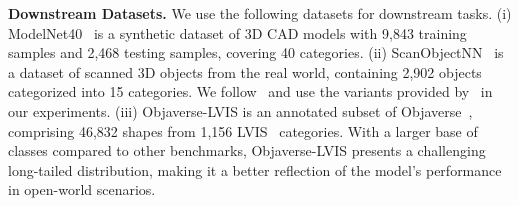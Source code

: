 \documentclass{article}
\begin{document}
\begin{table}[h]
\begin{minipage}{.53\linewidth}
\end{minipage}\hspace{.02\linewidth}
\begin{minipage}{.43\linewidth}
\centering
\caption{CLIP models used in experiments. } \label{tab:clip-models}
\vspace{0.3cm}
\end{minipage}
\vspace{-0.1cm}
\end{table}

\textbf{Downstream Datasets.} We use the following datasets for downstream tasks.
(i) ModelNet40~\cite{wu2015modelnet} is a synthetic dataset of 3D CAD models with 9,843 training samples and 2,468 testing samples, covering 40 categories.
(ii) ScanObjectNN~\cite{uy2019scanobjectnn} is a dataset of scanned 3D objects from the real world, containing 2,902 objects categorized into 15 categories. We follow~\cite{xue2023ulip,xue2023ulip2,liu2023openshape} and use the variants provided by~\cite{yu2022pointbert} in our experiments.
(iii) Objaverse-LVIS is an annotated subset of Objaverse~\cite{deitke2023objaverse}, comprising 46,832 shapes from 1,156 LVIS~\cite{gupta2019lvis} categories. With a larger base of classes compared to other benchmarks, Objaverse-LVIS presents a challenging long-tailed distribution, making it a better reflection of the model's performance in open-world scenarios.
\end{document}
